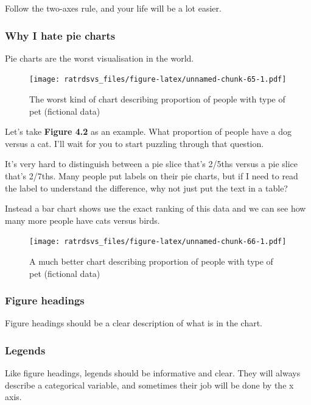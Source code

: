 \documentclass[
]{book}
\begin{document}
Follow the two-axes rule, and your life will be a lot easier.

\hypertarget{why-i-hate-pie-charts}{%
\subsubsection{Why I hate pie charts}\label{why-i-hate-pie-charts}}

Pie charts are the worst visualisation in the world.

\begin{figure}
\centering
\texttt{[image: ratrdsvs\_files/figure-latex/unnamed-chunk-65-1.pdf]}
\caption{\label{fig:unnamed-chunk-65}The worst kind of chart describing proportion of people with type of pet (fictional data)}
\end{figure}

Let's take \textbf{Figure 4.2} as an example. What proportion of people have a dog versus a cat. I'll wait for you to start puzzling through that question.

It's very hard to distinguish between a pie slice that's 2/5ths versus a pie slice that's 2/7ths. Many people put labels on their pie charts, but if I need to read the label to understand the difference, why not just put the text in a table?

Instead a bar chart shows use the exact ranking of this data and we can see how many more people have cats versus birds.

\begin{figure}
\centering
\texttt{[image: ratrdsvs\_files/figure-latex/unnamed-chunk-66-1.pdf]}
\caption{\label{fig:unnamed-chunk-66}A much better chart describing proportion of people with type of pet (fictional data)}
\end{figure}

\hypertarget{figure-headings}{%
\subsubsection{Figure headings}\label{figure-headings}}

Figure headings should be a clear description of what is in the chart.

\hypertarget{legends}{%
\subsubsection{Legends}\label{legends}}

Like figure headings, legends should be informative and clear. They will always describe a categorical variable, and sometimes their job will be done by the x axis.
\end{document}
